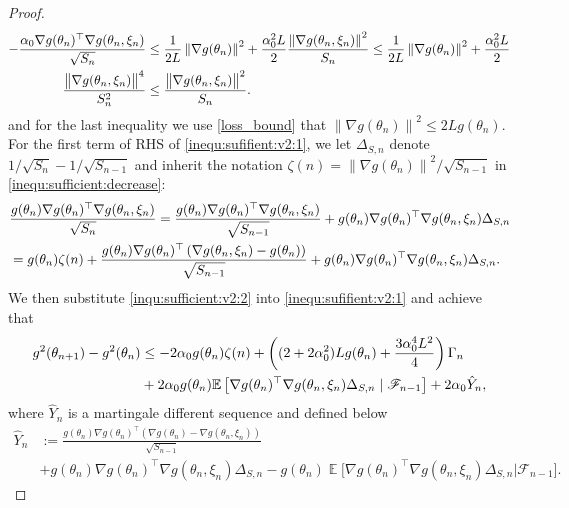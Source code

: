 \documentclass[standalone]{article}
\newcommand{\E}{\mathbb{E}}
\DeclareMathOperator{\Expect}{\mathbb{E}}
\begin{document}
\begin{proof}
\begin{align}
- \frac{\alpha_0\nabla g(\theta_{n})^{\top}\nabla g(\theta_{n},\xi_{n})}{\sqrt{S_{n}}} 
& \leq \frac{1}{2 L}\left\|\nabla g(\theta_{n})\right\|^2 + \frac{\alpha_0^2 L}{2} \frac{\left\|\nabla g(\theta_{n},\xi_{n}) \right\|^2}{S_n} \leq \frac{1}{2 L}\left\|\nabla g(\theta_{n})\right\|^2 + \frac{\alpha_0^2 L}{2}  \notag \\
\frac{\big\|\nabla g(\theta_{n},\xi_{n})\big\|^{4}}{S_{n}^2} &  \leq \frac{\big\|\nabla g(\theta_{n},\xi_{n})\big\|^{2}}{S_{n}}.
\end{align}
and for the last inequality we use \cref{loss_bound} that $\left\|\nabla g(\theta_n) \right\|^2 \leq 2 Lg(
\theta_n).$
For the first term of RHS of \cref{inequ:sufifient:v2:1}, we let $\Delta_{S, n}$ denote  $1/\sqrt{S_n} -1/\sqrt{S_{n-1}}$ and inherit the notation $\zeta(n) = \left\|\nabla g(\theta_{n})\right\|^2/\sqrt{S_{n-1}}$ in \cref{inequ:sufficient:decrease}:
\begin{align}\label{inqu:sufficient:v2:2}
&\frac{g(\theta_{n})\nabla g(\theta_{n})^{\top}\nabla g(\theta_{n},\xi_{n})}{\sqrt{S_{n}}}  = \frac{g(\theta_{n})\nabla g(\theta_{n})^{\top}\nabla g(\theta_{n},\xi_{n})}{\sqrt{S_{n-1}}} + g(\theta_{n})\nabla g(\theta_{n})^{\top}\nabla g(\theta_{n},\xi_{n})\Delta_{S,n} \notag \\ 
& = g(\theta_{n}) \zeta(n)  + \frac{g(\theta_{n})\nabla g(\theta_{n})^{\top}\left( \nabla g(\theta_{n},\xi_{n})- g(\theta_{n})\right)}{\sqrt{S_{n-1}}} + g(\theta_{n})\nabla g(\theta_{n})^{\top}\nabla g(\theta_{n},\xi_{n})\Delta_{S,n}.
\end{align}
We then substitute \cref{inqu:sufficient:v2:2} into \cref{inequ:sufifient:v2:1} and achieve that
\begin{align}\label{inequ:sufficient:v2:3}
g^{2}(\theta_{n+1})-g^{2}(\theta_{n}) 
&\le - 2\alpha_0 g(\theta_{n})\zeta(n) + \left((2+2\alpha_0^2) Lg(\theta_n) + \frac{3\alpha_0^4 L^2}{4} \right)\Gamma_n\notag \\
& + 2\alpha_0g(\theta_{n})\E\left[\nabla g(\theta_{n})^{\top}\nabla g(\theta_{n},\xi_{n})\Delta_{S,n} \mid \mathscr{F}_{n-1}\right] + 2\alpha_0\hat{Y}_n,
\end{align}
where $\hat{Y}_n$ is a martingale different sequence and defined below
\begin{equation}\nonumber\begin{aligned}
 \hat{Y}_n &:=\frac{g(\theta_{n})\nabla g(\theta_{n})^{\top}(\nabla g(\theta_{n})-\nabla g(\theta_{n},\xi_{n}))}{\sqrt{S_{n-1}}}\\&+g(\theta_{n})\nabla g(\theta_{n})^{\top}\nabla g(\theta_{n},\xi_{n})\Delta_{S, n}-g(\theta_{n})\Expect\bigg[\nabla g(\theta_{n})^{\top}\nabla g(\theta_{n},\xi_{n})\Delta_{S, n}\bigg|\mathscr{F}_{n-1}\bigg].\end{aligned}\end{equation}

\end{proof}
\end{document}
